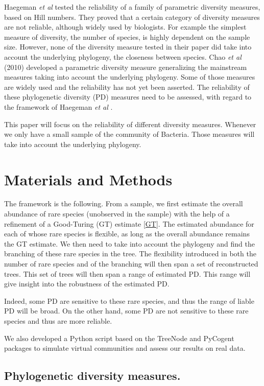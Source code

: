 \documentclass{article}
\begin{document}
Haegeman \textit{et al} \cite{Haegeman2013} tested the reliability of a family of parametric diversity measures, based on Hill numbers. They proved that a certain category of diversity measures are not reliable, although widely used by biologists. For example the simplest measure of diversity, the number of species, is highly dependent on the sample size. However, none of the diversity measure tested in their paper did take into account the underlying phylogeny, the closeness between species. Chao \textit{et al} (2010) \cite{Chao2010} developed a parametric diversity measure generalizing the mainstream measures taking into account the underlying phylogeny. Some of those measures are widely used and the reliability has not yet been asserted. The reliability of these phylogenetic diversity (PD) measures need to be assessed, with regard to the framework of Haegeman \textit{et al} \cite{Haegeman2013}.

This paper will focus on the reliability of different diversity measures. Whenever we only have a small sample of the community of Bacteria. Those measures will take into account the underlying phylogeny. 


\section*{Materials and Methods}


The framework is the following. From a sample, we first estimate the overall abundance of rare species (unobserved in the sample) with the help of a refinement of a Good-Turing (GT) estimate \ref{GT}. 
The estimated abundance for each of whose rare species is flexible, as long as the overall abundance remains the GT estimate. 
We then need to take into account the phylogeny and find the branching of these rare species in the tree.
The flexibility introduced in both the number of rare species and of the branching will then span a set of reconstructed trees.
This set of trees will then span a range of estimated PD. This range will give insight into the robustness of the estimated PD.
 
Indeed, some PD are sensitive to these rare species, and thus the range of liable PD will be broad. On the other hand, some PD are not sensitive to these rare species and thus are more reliable.

We also developed a Python script based on the TreeNode and PyCogent packages to simulate virtual communities and assess our results on real data.

\subsection*{Phylogenetic diversity measures.} 
\end{document}

